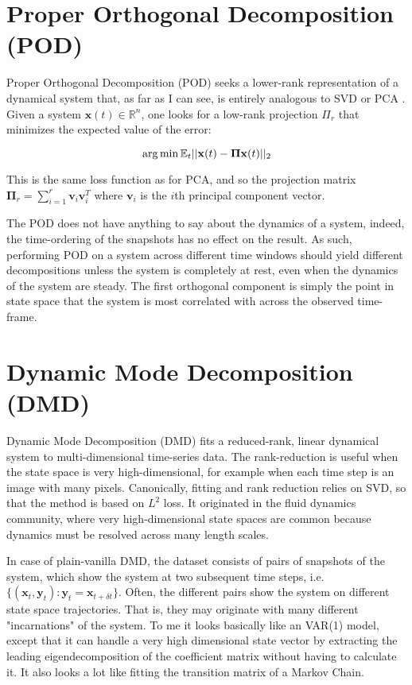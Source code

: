 
\section{Proper Orthogonal Decomposition (POD)}
Proper Orthogonal Decomposition (POD) seeks a lower-rank representation of a dynamical system that, as far as I can see, is entirely analogous to SVD or PCA \cite{megretski2004pod}. Given a system $\mathbf{x}(t) \in \mathbb{R}^n$, one looks for a low-rank projection $\Pi_r$ that minimizes the expected value of the error:

\begin{equation}
\operatorname*{arg\,min} \mathbb{E}_t||\mathbf{x}(t) - \mathbf{\Pi}\mathbf{x}(t)||_{2}
\end{equation} 

This is the same loss function as for PCA, and so the projection matrix $\mathbf{\Pi}_r = \sum_{i=1}^{r} \mathbf{v}_i\mathbf{v}^T_i$ where $\mathbf{v}_i$ is the $i$th principal component vector. 

The POD does not have anything to say about the dynamics of a system, indeed, the time-ordering of the snapshots has no effect on the result. As such, performing POD on a system across different time windows should yield different decompositions unless the system is completely at rest, even when the dynamics of the system are steady. The first orthogonal component is simply the point in state space that the system is most correlated with across the observed time-frame.  

\section{Dynamic Mode Decomposition (DMD)}
\label{sec:dmd}
Dynamic Mode Decomposition (DMD) fits a reduced-rank, linear dynamical system to multi-dimensional time-series data. The rank-reduction is useful when the state space is very high-dimensional, for example when each time step is an image with many pixels. Canonically, fitting and rank reduction relies on SVD, so that the method is based on $L^2$ loss. It originated in the fluid dynamics community, where very high-dimensional state spaces are common because dynamics must be resolved across many length scales.

In case of plain-vanilla DMD, the dataset consists of pairs of snapshots of the system, which show the system at two subsequent time steps, i.e. $\{(\mathbf{x}_t,\mathbf{y}_t): \mathbf{y}_t = \mathbf{x}_{t+\delta t} \}$. Often, the different pairs show the system on different state space trajectories. That is, they may originate with many different "incarnations" of the system. To me it looks basically like an VAR(1) model, except that it can handle a very high dimensional state vector by extracting the leading eigendecomposition of the coefficient matrix without having to calculate it. It also looks a lot like fitting the transition matrix of a Markov Chain.

